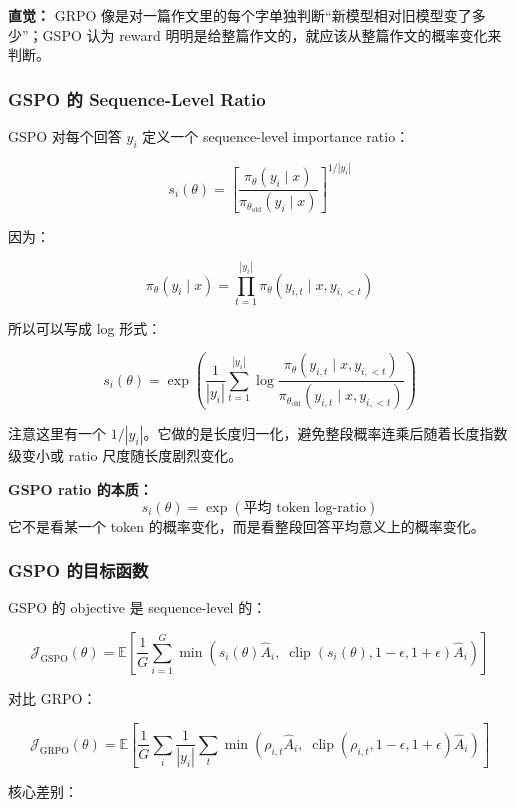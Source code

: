 \begin{intubox}
\textbf{直觉：} GRPO 像是对一篇作文里的每个字单独判断“新模型相对旧模型变了多少”；GSPO 认为 reward 明明是给整篇作文的，就应该从整篇作文的概率变化来判断。
\end{intubox}

\subsubsection{GSPO 的 Sequence-Level Ratio}

GSPO 对每个回答 $y_i$ 定义一个 sequence-level importance ratio：

\[
s_i(\theta)
=
\left[
\frac{
\pi_\theta(y_i\mid x)
}{
\pi_{\theta_\text{old}}(y_i\mid x)
}
\right]^{1/|y_i|}
\]

因为：

\[
\pi_\theta(y_i\mid x)
=
\prod_{t=1}^{|y_i|}
\pi_\theta(y_{i,t}\mid x,y_{i,<t})
\]

所以可以写成 log 形式：

\[
s_i(\theta)
=
\exp
\left(
\frac{1}{|y_i|}
\sum_{t=1}^{|y_i|}
\log
\frac{
\pi_\theta(y_{i,t}\mid x,y_{i,<t})
}{
\pi_{\theta_\text{old}}(y_{i,t}\mid x,y_{i,<t})
}
\right)
\]

注意这里有一个 $1/|y_i|$。它做的是长度归一化，避免整段概率连乘后随着长度指数级变小或 ratio 尺度随长度剧烈变化。

\begin{summarybox}
\textbf{GSPO ratio 的本质：}
\[
s_i(\theta)
=
\exp(\text{平均 token log-ratio})
\]
它不是看某一个 token 的概率变化，而是看整段回答平均意义上的概率变化。
\end{summarybox}

\subsubsection{GSPO 的目标函数}

GSPO 的 objective 是 sequence-level 的：

\[
\mathcal{J}_\text{GSPO}(\theta)
=
\mathbb{E}
\left[
\frac{1}{G}
\sum_{i=1}^{G}
\min
\left(
s_i(\theta)\hat{A}_i,\;
\operatorname{clip}(s_i(\theta),1-\epsilon,1+\epsilon)\hat{A}_i
\right)
\right]
\]

对比 GRPO：

\[
\mathcal{J}_\text{GRPO}(\theta)
=
\mathbb{E}
\left[
\frac{1}{G}
\sum_i
\frac{1}{|y_i|}
\sum_t
\min
\left(
\rho_{i,t}\hat{A}_i,\;
\operatorname{clip}(\rho_{i,t},1-\epsilon,1+\epsilon)\hat{A}_i
\right)
\right]
\]

核心差别：

